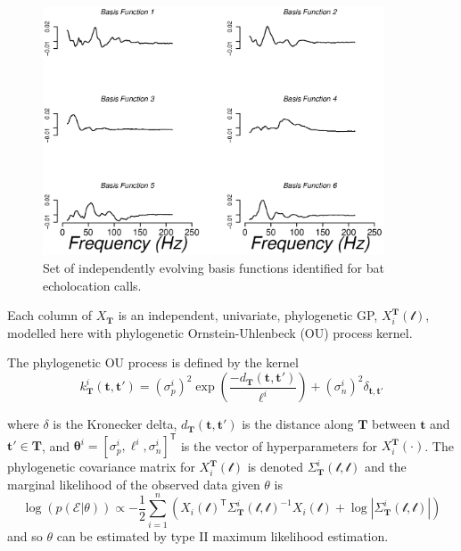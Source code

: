 \documentclass{ws-rv9x6}
\begin{document}
\begin{figure}[h]
	\centering
	\includegraphics[width = 0.9\textwidth]{../Figures/basis.eps}
	\caption{Set of independently evolving basis functions identified for bat echolocation calls. }
\end{figure}

Each column of \(X_{\mathbf{T}}\) is an independent, univariate, phylogenetic GP, \(X_i^{\mathbf{T}}(\mathcal{t})\), modelled here with phylogenetic Ornstein-Uhlenbeck (OU) process kernel.

The phylogenetic OU process is defined by the kernel
\begin{equation}
k_{\mathbf{T}}^i(\mathbf{t}, \mathbf{t}') = (\sigma_p^i)^2 \exp \left( \frac{-d_{\mathbf{T}}(\mathbf{t}, \mathbf{t}')}{\ell^i} \right) + (\sigma_n^i)^2 \delta_{\mathbf{t}, \mathbf{t}'}
\label{eqn:oukernel}
\end{equation}

where \(\delta\) is the Kronecker delta, \(d_{\mathbf{T}}(\mathbf{t}, \mathbf{t}')\) is the distance along \(\mathbf{T}\) between \(\mathbf{t}\) and \(\mathbf{t}' \in \mathbf{T}\), and \(\mathbf{\theta}^i = [\sigma_p^i, \ell^i, \sigma_n^i]^{\mathsf{T}}\) is the vector of hyperparameters for \(X_i^{\mathbf{T}}(\cdot)\). The phylogenetic covariance matrix for \(X_i^{\mathbf{T}}(\mathcal{t})\) is denoted \(\Sigma_{\mathbf{T}}^i(\mathcal{t}, \mathcal{t})\) and the marginal likelihood of the observed data given \(\theta\) is
\begin{equation}
\log(p(\mathcal{E} | \theta)) \propto -\frac{1}{2} \sum_{i = 1}^{n} \left( X_i(\mathcal{t})^{\mathsf{T}} \Sigma_{\mathbf{T}}^i(\mathcal{t}, \mathcal{t})^{-1}  X_i(\mathcal{t}) + \log |\Sigma_{\mathbf{T}}^i(\mathcal{t}, \mathcal{t})|    \right)
\label{eqn:t2mle}
\end{equation}
and so \(\theta\) can be estimated by type II maximum likelihood estimation.
\end{document}
